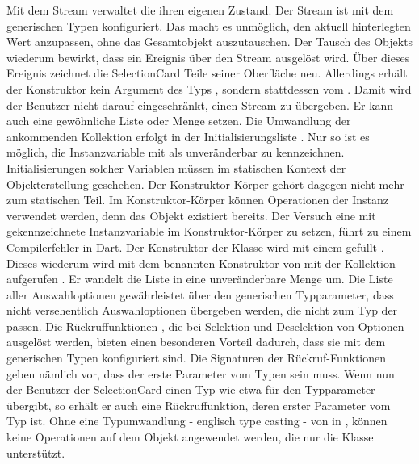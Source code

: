 Mit dem Stream  verwaltet die  ihren eigenen Zustand.
Der Stream ist mit dem generischen Typen  konfiguriert.
Das macht es unmöglich, den aktuell hinterlegten Wert anzupassen, ohne das Gesamtobjekt auszutauschen.
Der Tausch des Objekts wiederum bewirkt, dass ein Ereignis über den Stream ausgelöst wird. Über dieses Ereignis zeichnet die SelectionCard Teile seiner Oberfläche neu. Allerdings erhält der Konstruktor kein Argument des Typs , sondern stattdessen vom  . Damit wird der Benutzer nicht darauf eingeschränkt, einen Stream zu übergeben. Er kann auch eine gewöhnliche Liste oder Menge setzen. Die Umwandlung der ankommenden Kollektion erfolgt in der Initialisierungsliste . Nur so ist es möglich, die Instanzvariable mit  als unveränderbar zu kennzeichnen. Initialisierungen solcher Variablen müssen im statischen Kontext der Objekterstellung geschehen. Der Konstruktor-Körper gehört dagegen nicht mehr zum statischen Teil. Im Konstruktor-Körper können Operationen der Instanz verwendet werden, denn das Objekt existiert bereits. Der Versuch eine mit  gekennzeichnete Instanzvariable im Konstruktor-Körper zu setzen, führt zu einem Compilerfehler in Dart. Der Konstruktor  der Klasse  wird mit einem  gefüllt . Dieses wiederum wird mit dem benannten Konstruktor  von  mit der Kollektion aufgerufen . Er wandelt die  Liste in eine unveränderbare Menge um. Die Liste aller Auswahloptionen   gewährleistet über den generischen Typparameter, dass nicht versehentlich Auswahloptionen übergeben werden, die nicht zum Typ der  passen. Die Rückruffunktionen , die bei Selektion und Deselektion von Optionen ausgelöst werden, bieten einen besonderen Vorteil dadurch, dass sie mit dem generischen Typen konfiguriert sind. Die Signaturen der Rückruf-Funktionen  geben nämlich vor, dass der erste Parameter vom Typen  sein muss. Wenn nun der Benutzer der SelectionCard einen Typ wie etwa  für den Typparameter übergibt, so erhält er auch eine Rückruffunktion, deren erster Parameter vom Typ  ist. Ohne eine Typumwandlung - englisch type casting - von  in , können keine Operationen auf dem Objekt angewendet werden, die nur die Klasse  unterstützt.

